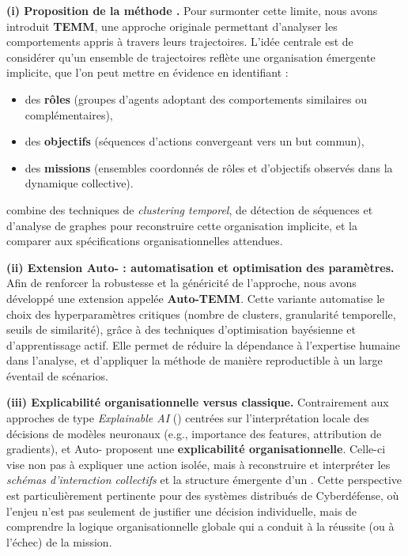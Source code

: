 \medskip
\noindent
\textbf{(i) Proposition de la méthode .}
Pour surmonter cette limite, nous avons introduit \textbf{TEMM}, une approche originale permettant d'analyser les comportements appris à travers leurs trajectoires.
L'idée centrale est de considérer qu'un ensemble de trajectoires reflète une organisation émergente implicite, que l'on peut mettre en évidence en identifiant :
\begin{itemize}
  \item des \textbf{rôles} (groupes d'agents adoptant des comportements similaires ou complémentaires),
  \item des \textbf{objectifs} (séquences d'actions convergeant vers un but commun),
  \item des \textbf{missions} (ensembles coordonnés de rôles et d'objectifs observés dans la dynamique collective).
\end{itemize}
 combine des techniques de \textit{clustering temporel}, de détection de séquences et d'analyse de graphes pour reconstruire cette organisation implicite, et la comparer aux spécifications organisationnelles attendues.

\medskip
\noindent
\textbf{(ii) Extension Auto- : automatisation et optimisation des paramètres.}
Afin de renforcer la robustesse et la généricité de l'approche, nous avons développé une extension appelée \textbf{Auto-TEMM}.
Cette variante automatise le choix des hyperparamètres critiques (nombre de clusters, granularité temporelle, seuils de similarité), grâce à des techniques d'optimisation bayésienne et d'apprentissage actif.
Elle permet de réduire la dépendance à l'expertise humaine dans l'analyse, et d'appliquer la méthode de manière reproductible à un large éventail de scénarios.

\medskip
\noindent
\textbf{(iii) Explicabilité organisationnelle versus  classique.}
Contrairement aux approches de type \textit{Explainable AI} () centrées sur l'interprétation locale des décisions de modèles neuronaux (e.g., importance des features, attribution de gradients),  et Auto- proposent une \textbf{explicabilité organisationnelle}.
Celle-ci vise non pas à expliquer une action isolée, mais à reconstruire et interpréter les \textit{schémas d'interaction collectifs} et la structure émergente d'un .
Cette perspective est particulièrement pertinente pour des systèmes distribués de Cyberdéfense, où l'enjeu n'est pas seulement de justifier une décision individuelle, mais de comprendre la logique organisationnelle globale qui a conduit à la réussite (ou à l'échec) de la mission.

